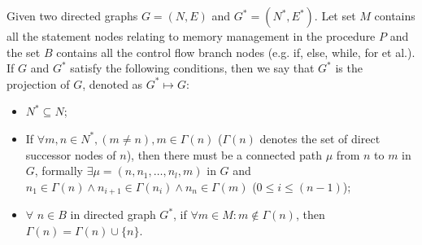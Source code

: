 \begin{definition}
Given two directed graphs $G = (N, E)$ and $G^* = (N^*, E^*)$. Let set $M$ contains all the statement nodes relating to memory management in the procedure $P$ and the set $B$ contains all the control flow branch nodes (e.g. {\sf if}, {\sf else}, {\sf while}, {\sf for} et al.). If $G$ and $G^*$ satisfy the following conditions, then we say that $G^*$ is the projection of $G$, denoted as $G^* \mapsto G$:
\begin{itemize}
\item
$N^*\subseteq N$;
\item
If $\forall m,n\in N^*,(m\neq n), m\in \Gamma(n)$ ($\Gamma(n)$ denotes the set of direct successor nodes of $n$), then there must be a connected path $\mu$ from $n$ to $m$ in $G$, formally $\exists \mu=(n, n_1,\ldots,n_l,m)$ in $G$ and $n_1\in\Gamma(n) \land  n_{i+1}\in\Gamma(n_i) \land n_n\in \Gamma(m)$ ($0\leq i\leq (n-1)$);
\item
$\forall$ $n\in B$ in directed graph $G^*$, if $\forall m\in M: m\not\in \Gamma(n)$, then $\Gamma(n)=\Gamma(n)\cup\{n\}$. 
\end{itemize}
\end{definition}




